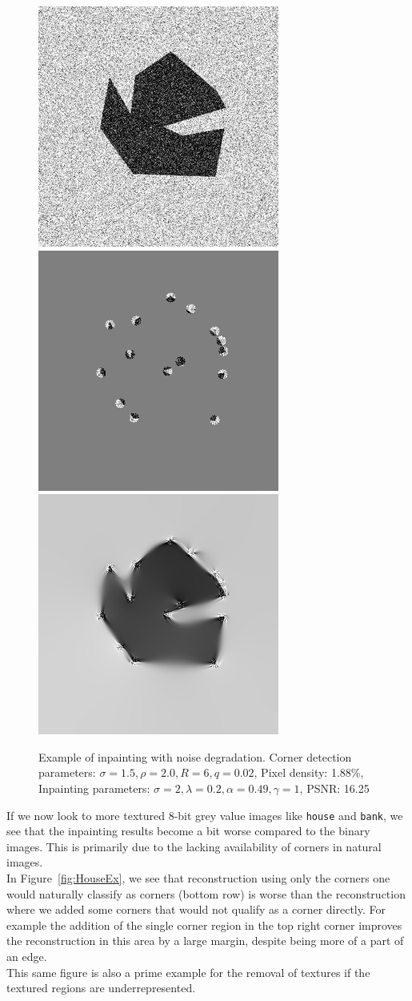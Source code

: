 \begin{figure}[ht]
    \centering
    \includegraphics[width=0.29\linewidth]{../../images/binary/abstract1_noise.png}
    \includegraphics[width=0.29\linewidth]{../Images/abstract/abstract1_noise-mask.png}
    \includegraphics[width=0.29\linewidth]{../Images/abstract/abstract1_noise-inpaint.png}
    \caption{Example of inpainting with noise degradation. Corner detection parameters:
    $\sigma=1.5,\rho=2.0,R=6,q=0.02$, Pixel density: 1.88\%, Inpainting parameters:
$\sigma=2,\lambda=0.2,\alpha=0.49,\gamma=1$, PSNR: 16.25}\label{fig:AbstractNoise2}
\end{figure}                                       
If we now look to more textured 8-bit grey value images like \texttt{house} and \texttt{bank}, we
see that the inpainting results become a bit worse compared to the binary images. This is primarily
due to the lacking availability of corners in natural images.\\
In Figure~\ref{fig:HouseEx}, we see that reconstruction using only the corners one would naturally
classify as corners (bottom row) is worse than the reconstruction where we added some corners that
would not qualify as a corner directly. For example the addition of the single corner region in the
top right corner improves the reconstruction in this area by a large margin, despite being more of
a part of an edge.\\
This same figure is also a prime example for the removal of textures if the textured regions are
underrepresented.

